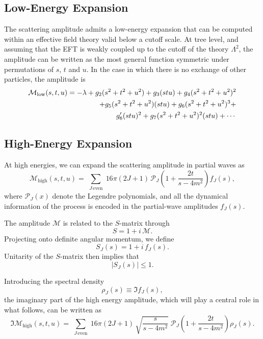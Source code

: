 \subsection{Low-Energy Expansion}
The scattering amplitude admits a low-energy expansion that can be computed within an effective field theory valid below a cutoff scale. At tree level, and assuming that the EFT is weakly coupled up to the cutoff of the theory $\Lambda^2$, the amplitude can be written as the most general function symmetric under permutations of $s$, $t$ and $u$. In the case in which there is no exchange of other particles, the amplitude is
\begin{eqnarray}
    \mathcal{M}_{\text{low}}(s,t,u) = - \lambda 
     + g_2 (s^2 + t^2 + u^2) + g_3 (stu) + g_4 (s^2 + t^2 + u^2)^2 \notag \\ + g_5 (s^2 + t^2 + u^2)(stu) 
    + g_6 (s^2 + t^2 + u^2)^3 +\notag \\ g_6'(stu)^2 + g_7 (s^2 + t^2 + u^2)^2(stu) + \cdots \,
    \label{eq:eft} 
\end{eqnarray}

\subsection{High-Energy Expansion}

At high energies, we can expand the scattering amplitude in partial waves as
\begin{equation}
    \mathcal{M}_{\text{high}}(s,t,u)
    =
    \sum_{\substack{J \,\text{even}}}
    16\pi(2J+1)\,
    \mathcal{P}_J\left(1+\frac{2t}{s-4m^2}\right)
    f_J(s),
\end{equation}
where $\mathcal{P}_J(x)$ denote the Legendre polynomials, and all the dynamical information of the process is encoded in the partial-wave amplitudes $f_J(s)$.

The amplitude $\mathcal{M}$ is related to the $S$-matrix through
\begin{equation}
    S = 1 + i\,\mathcal{M}.
\end{equation}
Projecting onto definite angular momentum, we define
\begin{equation}
    S_J(s) = 1 + i\, f_J(s).
\end{equation}
Unitarity of the $S$-matrix then implies that
\begin{equation}
    |S_J(s)| \leq 1.
\end{equation}

Introducing the spectral density
\begin{equation}
    \rho_J(s) \equiv \Im f_J(s),
\end{equation}
the imaginary part of the high energy amplitude, which will play a central role in what follows, can be written as
\begin{equation}
    \Im \mathcal{M}_{\text{high}}(s,t,u)
    =
    \sum_{\substack{J \,\text{even}}}
    16\pi(2J+1)\,  \sqrt{ \frac{s}{s-4m^2} } \;
    \mathcal{P}_J\left(1+\frac{2t}{s-4m^2}\right)
    \rho_J(s).
    \label{eq:highendecomp}
\end{equation}
    
